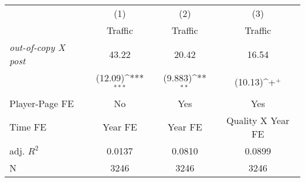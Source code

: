 {
\def\sym#1{\ifmmode^{#1}\else\(^{#1}\)\fi}
\begin{tabular*}{\hsize}{@{\hskip\tabcolsep\extracolsep\fill}l*{3}{c}}
\toprule
            &\multicolumn{1}{c}{(1)}&\multicolumn{1}{c}{(2)}&\multicolumn{1}{c}{(3)}\\
            &\multicolumn{1}{c}{Traffic}&\multicolumn{1}{c}{Traffic}&\multicolumn{1}{c}{Traffic}\\
\midrule
\emph{out-of-copy X post}&       43.22         &       20.42         &       16.54         \\
            &     (12.09)\sym{***}&     (9.883)\sym{**} &     (10.13)\sym{+}  \\
\midrule
Player-Page FE&          No         &         Yes         &         Yes         \\
Time FE     &     Year FE         &     Year FE         &Quality X Year FE         \\
adj. $R^2$  &      0.0137         &      0.0810         &      0.0899         \\
N           &        3246         &        3246         &        3246         \\
\bottomrule
\end{tabular*}
}
